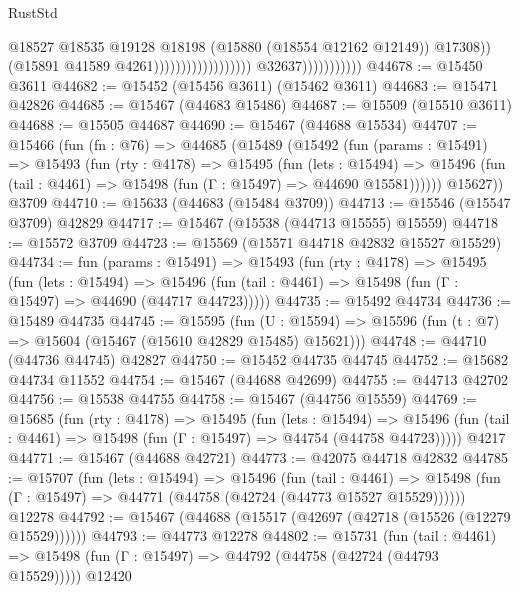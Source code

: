 \begin{lexlean}{RustStd}
\begin{coremodule}
                                                                @18527
                                                                @18535
                                                                @19128
                                                                @18198
                                                                (@15880 (@18554 @12162 @12149))
                                                                @17308))
                                                            (@15891 @41589 @4261))))))))))))))))))
                          @32637)))))))))))
@44678 := @15450 @3611
@44682 := @15452 (@15456 @3611) (@15462 @3611)
@44683 := @15471 @42826
@44685 := @15467 (@44683 @15486)
@44687 := @15509 (@15510 @3611)
@44688 := @15505 @44687
@44690 := @15467 (@44688 @15534)
@44707 := @15466
    (fun (fn : @76) =>
    @44685
      (@15489
        (@15492
          (fun (params : @15491) =>
          @15493
            (fun (rty : @4178) =>
            @15495
              (fun (lets : @15494) =>
              @15496 (fun (tail : @4461) => @15498 (fun (Γ : @15497) => @44690 @15581))))))
        @15627))
    @3709
@44710 := @15633 (@44683 (@15484 @3709))
@44713 := @15546 (@15547 @3709) @42829
@44717 := @15467 (@15538 (@44713 @15555) @15559)
@44718 := @15572 @3709
@44723 := @15569 (@15571 @44718 @42832 @15527 @15529)
@44734 := fun (params : @15491) =>
  @15493
    (fun (rty : @4178) =>
    @15495
      (fun (lets : @15494) =>
      @15496 (fun (tail : @4461) => @15498 (fun (Γ : @15497) => @44690 (@44717 @44723)))))
@44735 := @15492 @44734
@44736 := @15489 @44735
@44745 := @15595
    (fun (U : @15594) => @15596 (fun (t : @7) => @15604 (@15467 (@15610 @42829 @15485) @15621)))
@44748 := @44710 (@44736 @44745) @42827
@44750 := @15452 @44735 @44745
@44752 := @15682 @44734 @11552
@44754 := @15467 (@44688 @42699)
@44755 := @44713 @42702
@44756 := @15538 @44755
@44758 := @15467 (@44756 @15559)
@44769 := @15685
    (fun (rty : @4178) =>
    @15495
      (fun (lets : @15494) =>
      @15496 (fun (tail : @4461) => @15498 (fun (Γ : @15497) => @44754 (@44758 @44723)))))
    @4217
@44771 := @15467 (@44688 @42721)
@44773 := @42075 @44718 @42832
@44785 := @15707
    (fun (lets : @15494) =>
    @15496
      (fun (tail : @4461) =>
      @15498 (fun (Γ : @15497) => @44771 (@44758 (@42724 (@44773 @15527 @15529))))))
    @12278
@44792 := @15467 (@44688 (@15517 (@42697 (@42718 (@15526 (@12279 @15529))))))
@44793 := @44773 @12278
@44802 := @15731
    (fun (tail : @4461) => @15498 (fun (Γ : @15497) => @44792 (@44758 (@42724 (@44793 @15529)))))
    @12420

\end{coremodule}
\end{lexlean}
